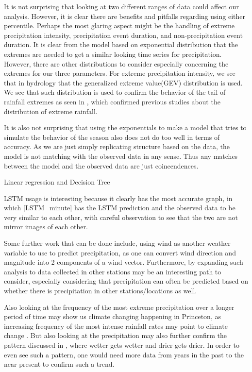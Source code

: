 \documentclass[11pt]{report}
\begin{document}
It is not surprising that looking at two different ranges of data could
affect our analysis. However, it is clear there are benefits and pitfalls
regarding using either percentile. Perhaps the most glaring aspect might
be the handling of extreme precipitation intensity, precipitation event
duration, and non-precipitation event duration. It is clear from the
model based on exponential distribution that the extremes are needed to
get a similar looking time series for precipitation. However, there are
other distributions to consider especially concerning the extremes for
our three parameters. For extreme precipitation intensity, we see that in
hydrology that the generalized extreme value(GEV) distribution is used.
We see that such distribution is used to confirm the behavior of the tail
of rainfall extremes as seen in \cite[]{Hydro_dist}, which confirmed
previous studies about the distribution of extreme rainfall.  

It is also not surprising that using the exponentials to make a model that tries to simulate the behavior of the season also does not do too well in terms of accuracy. As we are just simply replicating structure based on the data, the model is not matching with the observed data in any sense. Thus any matches between the model and the observed data are just coincendences. 

Linear regression and Decision Tree

LSTM usage is interesting because it clearly has the most accurate graph, in which \ref{LSTM_minute} has the LSTM prediction and the observed data to be very similar to each other, with careful observation to see that the two are not mirror images of each other.  

Some further work that can be done include, using wind as another weather
variable to use to predict precipitation, as one can convert wind
direction and magnitude into 2 components of a wind vector. Furthermore,
by expanding such analysis to data collected in other stations may be an
interesting path to consider, especially considering that precipitation
can often be predicted based on whether there is precipitation in other
stations/locations as well. 

Also looking at the frequency of the most extreme precipitation over a longer period of time may show us climate changing happening in Princeton, as  increasing frequency of the most intense rainfall rates may point to climate change . But also looking at the precipitation may also further confirm the pattern discussed in \cite{Held}, where wetter gets wetter and drier gets drier. In order to even see such a pattern, one would need more data from years in the past to the near present to confirm such a trend. 
\small
\renewcommand{\bibsep}{0em}
\end{document}
